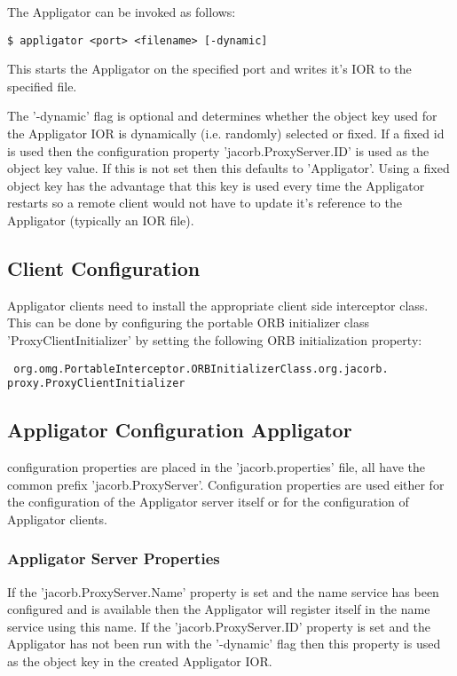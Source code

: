 The Appligator can be invoked as follows:

\verb+$ appligator <port> <filename> [-dynamic]+

This starts the Appligator on the specified port and writes it's IOR
to the specified file.

The '-dynamic' flag is optional and determines whether the object key
used for the Appligator IOR is dynamically (i.e. randomly) selected or
fixed. If a fixed id is used then the configuration property
'jacorb.ProxyServer.ID' is used as the object key value. If this is
not set then this defaults to 'Appligator'. Using a fixed object key
has the advantage that this key is used every time the Appligator
restarts so a remote client would not have to update it's reference to
the Appligator (typically an IOR file).

\subsection{Client Configuration}

Appligator clients need to install the appropriate client side
interceptor class. This can be done by configuring the portable ORB
initializer class 'ProxyClientInitializer' by setting the following
ORB initialization property:

{\noindent\tt\small
  org.omg.PortableInterceptor.ORBInitializerClass.org.jacorb.\\
proxy.ProxyClientInitializer}

\subsection{Appligator Configuration Appligator}

configuration properties are
placed in the 'jacorb.properties' file, all have the common prefix
'jacorb.ProxyServer'. Configuration properties are used either for the
configuration of the Appligator server itself or for the configuration
of Appligator clients.

\subsubsection{Appligator Server Properties}

If the 'jacorb.ProxyServer.Name' property is set and the name service
has been configured and is available then the Appligator will register
itself in the name service using this name.  If the
'jacorb.ProxyServer.ID' property is set and the Appligator has not
been run with the '-dynamic' flag then this property is used as the
object key in the created Appligator IOR.

